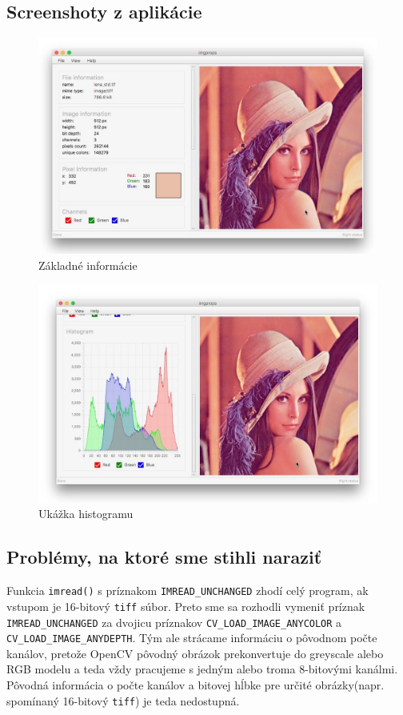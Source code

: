 \documentclass[12pt,a4paper,titlepage,final]{article}
\begin{document}
\subsection{Screenshoty z aplikácie}
\begin{figure}[!h]
	\centering
	\includegraphics[width=15cm]{img/screenshot1.jpeg}
	\caption{Základné informácie}
\end{figure}

\begin{figure}[!h]
	\centering
	\includegraphics[width=15cm]{img/screenshot2.jpeg}
	\caption{Ukážka histogramu}
\end{figure}

\subsection{Problémy, na ktoré sme stihli naraziť}
Funkcia \verb|imread()| s príznakom \verb|IMREAD_UNCHANGED| zhodí celý program, ak vstupom je 16-bitový \verb|tiff| súbor. Preto sme sa rozhodli vymeniť príznak \verb|IMREAD_UNCHANGED| za dvojicu príznakov \verb|CV_LOAD_IMAGE_ANYCOLOR| a \verb|CV_LOAD_IMAGE_ANYDEPTH|. Tým ale strácame informáciu o pôvodnom počte kanálov, pretože OpenCV pôvodný obrázok prekonvertuje do greyscale alebo RGB modelu a teda vždy pracujeme s jedným alebo troma 8-bitovými kanálmi. Pôvodná informácia o počte kanálov a bitovej hĺbke pre určité obrázky(napr. spomínaný 16-bitový \verb|tiff|) je teda nedostupná.


\newpage
{}


\end{document}
